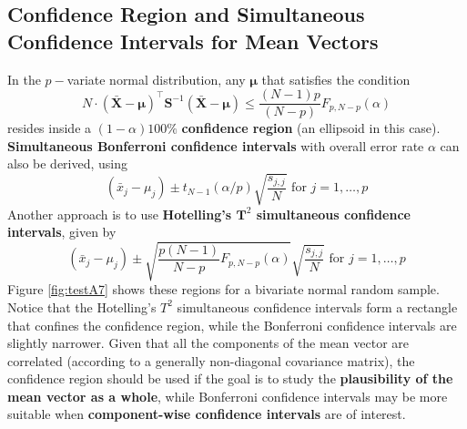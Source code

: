 \subsection[Confidence Region and Simultaneous Confidence Intervals]{Confidence Region and Simultaneous Confidence Intervals for Mean Vectors}
In the $p-$variate normal distribution, any $\bm{\mu}$ that satisfies the condition
$$
    N\cdot (\bm{\bar{X}}-\bm{\mu})^{\!\top}\bm{S}^{-1}(\bm{\bar{X}}-\bm{\mu}) \leq \frac{(N-1)p}{(N-p)}F_{p, N-p}(\alpha)
$$
resides inside a $(1-\alpha)100\%$ \textbf{confidence region} (an ellipsoid in this case). \textbf{Simultaneous Bonferroni confidence intervals} with overall error rate $\alpha$ can also be derived, using 
\begin{equation*}
    (\bar{x}_{j}-\mu_{j})\pm t_{N-1}(\alpha/p)\sqrt{\frac{s_{j,j}}{N}} \text{ for $j=1,\ldots, p$}
\end{equation*}
Another approach is to use \textbf{Hotelling's $\bm{T}^2$ simultaneous confidence intervals}, given by 
\begin{equation*}
    (\bar{x}_{j}-\mu_{j})\pm \sqrt{\frac{p(N-1)}{N-p}F_{p,N-p}(\alpha)} \sqrt{\frac{s_{j,j}}{N}} \text{ for $j=1,\ldots, p$}
\end{equation*}
Figure \ref{fig:testA7} shows these regions for a bivariate normal random sample. Notice that the Hotelling's ${T}^{2}$ simultaneous confidence intervals form a rectangle that confines the confidence region, while the Bonferroni confidence intervals are slightly narrower. Given that all the components of the mean vector are correlated (according to a generally non-diagonal covariance matrix), the confidence region should be used if the goal is to study the \textbf{plausibility of the mean vector as a whole}, while Bonferroni confidence intervals may be more suitable when \textbf{component-wise confidence intervals} are of interest. 




